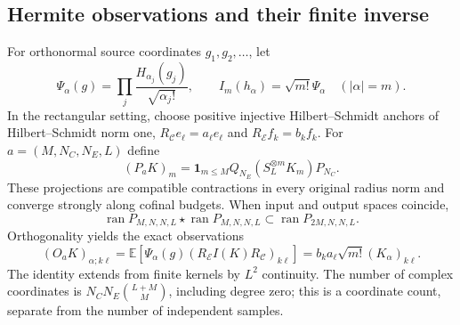 \documentclass[11pt,a4paper]{amsart}
\numberwithin{equation}{section}
\theoremstyle{definition}
\theoremstyle{remark}
\newcommand{\E}{\mathbb E}
\newcommand{\cC}{\mathcal C}
\newcommand{\cE}{\mathcal E}
\DeclareMathOperator{\ran}{ran}
\begin{document}
\subsection{Hermite observations and their finite inverse}
For orthonormal source coordinates $g_1,g_2,\ldots$, let
\[
 \Psi_\alpha(g)=\prod_j\frac{H_{\alpha_j}(g_j)}{\sqrt{\alpha_j!}},
 \qquad I_m(h_\alpha)=\sqrt{m!}\Psi_\alpha\quad(|\alpha|=m).
\]
In the rectangular setting, choose positive injective Hilbert--Schmidt anchors of Hilbert--Schmidt norm one,
$R_\cC e_\ell=a_\ell e_\ell$ and $R_\cE f_k=b_kf_k$.
For $a=(M,N_C,N_E,L)$ define
\begin{equation}\label{eq:finiteprojection}
 (P_aK)_m=\mathbf1_{m\le M}
 Q_{N_E}(S_L^{\otimes m}K_m)P_{N_C}.
\end{equation}
These projections are compatible contractions in every original radius norm and converge strongly along cofinal budgets. When input and output spaces coincide,
\[
 \ran P_{M,N,N,L}\star\ran P_{M,N,N,L}
 \subset\ran P_{2M,N,N,L}.
\]
Orthogonality yields the exact observations
\begin{equation}\label{eq:finiteHermite}
 (O_aK)_{\alpha;k\ell}
 =\E[\Psi_\alpha(g)(R_\cE I(K)R_\cC)_{k\ell}]
 =b_ka_\ell\sqrt{m!}(K_\alpha)_{k\ell}.
\end{equation}
The identity extends from finite kernels by $L^2$ continuity. The number of complex coordinates is
$N_CN_E\binom{L+M}{M}$, including degree zero; this is a coordinate count, separate from the number of independent samples.
\end{document}
